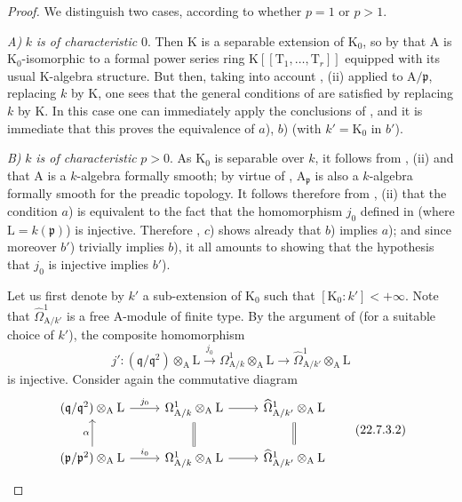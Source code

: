 \begin{proof}
We distinguish two cases, according to whether $p=1$ or $p>1$.

\emph{A)} $k$ \emph{is of characteristic} $0$.
Then $\mathrm{K}$ is a separable extension of $\mathrm{K}_0$, so by  that $\mathrm{A}$ is $\mathrm{K}_0$-isomorphic to a formal power series ring $\mathrm{K}[[\mathrm{T}_1,\ldots,\mathrm{T}_r]]$ equipped with its usual $\mathrm{K}$-algebra structure.
But then, taking into account , (ii) applied to $\mathrm{A}/\mathfrak{p}$, replacing $k$ by $\mathrm{K}$, one sees that the general conditions of  are satisfied by replacing $k$ by $\mathrm{K}$.
In this case one can immediately apply the conclusions of , and it is immediate that this proves the equivalence of $a$), $b$) (with $k'=\mathrm{K}_0$ in $b'$).

\emph{B)} $k$ \emph{is of characteristic} $p>0$.
As $\mathrm{K}_0$ is separable over $k$, it follows from , (ii) and  that $\mathrm{A}$ is a $k$-algebra formally smooth; by virtue of , $\mathrm{A}_\mathfrak{p}$ is also a $k$-algebra formally smooth for the preadic topology.
It follows therefore from , (ii) that the condition $a$) is equivalent to the fact that the homomorphism $j_0$ defined in  (where $\mathrm{L}=k(\mathfrak{p})$) is injective.
Therefore , $c$) shows already that $b$) implies $a$); and since moreover $b'$) trivially implies $b$), it all amounts to showing that the hypothesis that $j_0$ is injective implies $b'$).

Let us first denote by $k'$ a sub-extension of $\mathrm{K}_0$ such that $[\mathrm{K}_0:k']<+\infty$.
Note that $\widehat{\Omega}^1_{\mathrm{A}/k'}$ is a free $\mathrm{A}$-module of finite type.
By the argument of  (for a suitable choice of $k'$), the composite homomorphism
\[
\label{0.22.7.3.1}
  j':(\mathfrak{q}/\mathfrak{q}^2)\otimes_\mathrm{A}\mathrm{L}\xrightarrow{j_0}\Omega^1_{\mathrm{A}/k}\otimes_\mathrm{A}\mathrm{L}\to\widehat{\Omega}^1_{\mathrm{A}/k'}\otimes_\mathrm{A}\mathrm{L}
  \tag{22.7.3.1}
\]
is injective.
Consider again the commutative diagram
\[
\label{0.22.7.3.2}
  \begin{tikzcd}
    (\mathfrak{q}/\mathfrak{q}^2)\otimes_\mathrm{A}\mathrm{L} \ar[r,"j_0"] & \Omega^1_{\mathrm{A}/k}\otimes_\mathrm{A}\mathrm{L} \ar[r] & \widehat{\Omega}^1_{\mathrm{A}/k'}\otimes_\mathrm{A}\mathrm{L}\\
    (\mathfrak{p}/\mathfrak{p}^2)\otimes_\mathrm{A}\mathrm{L} \ar[u,"\alpha"] \ar[r,"i_0"] & \Omega^1_{\mathrm{A}/k}\otimes_\mathrm{A}\mathrm{L} \ar[r] \ar[u,equal] & \widehat{\Omega}^1_{\mathrm{A}/k'}\otimes_\mathrm{A}\mathrm{L} \ar[u,equal]
  \end{tikzcd}
  \tag{22.7.3.2}
\]


\end{proof}
